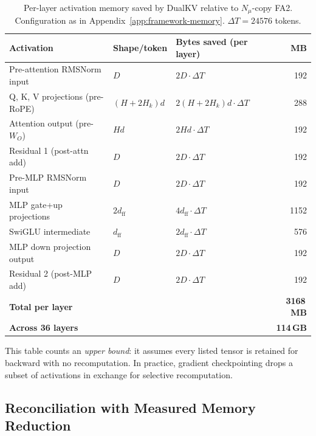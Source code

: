\documentclass{article}
\begin{document}
\begin{table}[ht]
\centering
\small
\caption{Per-layer activation memory saved by DualKV relative to $N_\mu$-copy FA2. Configuration as in Appendix~\ref{app:framework-memory}. $\Delta T = 24576$ tokens.}
\label{tab:framework-mem}
\begin{tabular}{@{}lllr@{}}
\toprule
\textbf{Activation} & \textbf{Shape/token} & \textbf{Bytes saved (per layer)} & \textbf{MB} \\
\midrule
Pre-attention RMSNorm input     & $D$                    & $2 D \cdot \Delta T$              & 192 \\
Q, K, V projections (pre-RoPE)  & $(H + 2 H_k) d$        & $2 (H + 2 H_k) d \cdot \Delta T$ & 288 \\
Attention output (pre-$W_O$)    & $H d$                  & $2 H d \cdot \Delta T$            & 192 \\
Residual 1 (post-attn add)      & $D$                    & $2 D \cdot \Delta T$              & 192 \\
Pre-MLP RMSNorm input           & $D$                    & $2 D \cdot \Delta T$              & 192 \\
MLP gate+up projections         & $2 d_{\text{ff}}$      & $4 d_{\text{ff}} \cdot \Delta T$  & 1152 \\
SwiGLU intermediate             & $d_{\text{ff}}$        & $2 d_{\text{ff}} \cdot \Delta T$  & 576 \\
MLP down projection output      & $D$                    & $2 D \cdot \Delta T$              & 192 \\
Residual 2 (post-MLP add)       & $D$                    & $2 D \cdot \Delta T$              & 192 \\
\midrule
\textbf{Total per layer}        &                        &                                     & \textbf{3168\,MB} \\
\textbf{Across 36 layers}       &                        &                                     & \textbf{114\,GB} \\
\bottomrule
\end{tabular}
\end{table}

This table counts an \emph{upper bound}: it assumes every listed tensor is retained for backward with no recomputation. In practice, gradient checkpointing drops a subset of activations in exchange for selective recomputation.

\subsection{Reconciliation with Measured Memory Reduction}
\end{document}
